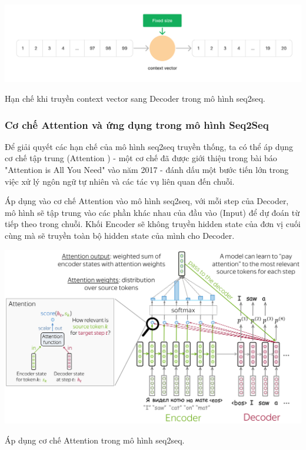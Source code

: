 \documentclass[a4paper, 12pt, openany]{book}
\begin{document}
\begin{itemize}
    \begin{minipage}{\linewidth}
        \captionsetup{type=figure}
        \centering
        \includegraphics[width=\linewidth]{./assets/images/seq2seq_context_vector.png}
        \caption{Hạn chế khi truyền context vector sang Decoder trong mô hình \ac{seq2seq}.}
    \end{minipage}
    \vspace{0.5cm}

\end{itemize}

\subsubsection{Cơ chế Attention và ứng dụng trong mô hình Seq2Seq}
Để giải quyết các hạn chế của mô hình \ac{seq2seq} truyền thống, ta có thể áp dụng cơ chế tập trung (Attention \cite{vaswani2023attention}) - một cơ chế đã được giới thiệu trong 
bài báo "Attention is All You Need" vào năm 2017 - đánh dấu một bước tiến lớn trong việc xử lý ngôn ngữ tự nhiên và các tác vụ liên quan đến chuỗi.

Áp dụng vào cơ chế Attention vào mô hình \ac{seq2seq}, với mỗi step của Decoder, mô hình sẽ tập trung vào các phần khác nhau của đầu vào (Input) để dự đoán từ tiếp theo trong chuỗi.
Khối Encoder sẽ không truyền hidden state của đơn vị cuối cùng mà sẽ truyền toàn bộ hidden state của mình cho Decoder. 

\begin{minipage}{\linewidth}
    \captionsetup{type=figure}
    \centering
    \includegraphics[width=\linewidth]{./assets/images/seq2seq_attention.png}
    \caption{Áp dụng cơ chế Attention trong mô hình \ac{seq2seq}.}
\end{minipage}
\vspace{0.5cm}
\end{document}
